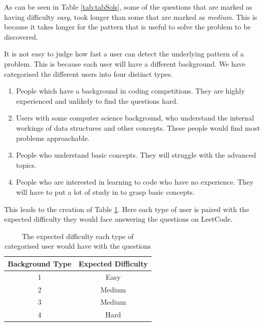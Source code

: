 \documentclass[conference]{IEEEtran}
\begin{document}
\par As can be seen in Table \ref{tab:tabSols}, some of the questions that are marked as having difficulty \textit{easy}, took longer than some that are marked as \textit{medium}. This is because it takes longer for the pattern that is useful to solve the problem to be discovered.
\par It is not easy to judge how fast a user can detect the underlying pattern of a problem. This is because each user will have a different background. We have categorised the different users into four distinct types. 
\begin{enumerate}
\item{People which have a background in coding competitions. They are highly experienced and unlikely to find the questions hard.}
\item{Users with some computer science background, who understand the internal workings of data structures and other concepts. These people would find most problems approachable.}
\item{People who understand basic concepts. They will struggle with the advanced topics.}
\item{People who are interested in learning to code who have no experience. They will have to put a lot of study in to grasp basic concepts.}
\end{enumerate}
This leads to the creation of Table \ref{tab:difficulty}. Here each type of user is paired with the expected difficulty they would face answering the questions on LeetCode. 

\begin{table}[H]
\centering
	\begin{tabular}{| c | c |} \hline
		  {\bf Background Type} &{\bf Expected Difficulty} \\ \hline
		1 & Easy \\ \hline
		2 & Medium \\ \hline
		3 & Medium  \\ \hline
		4 & Hard  \\ \hline
	\end{tabular}
	\caption{The expected difficulty each type of categorised user would have with the questions}
	\label{tab:difficulty}
\end{table}
\end{document}
